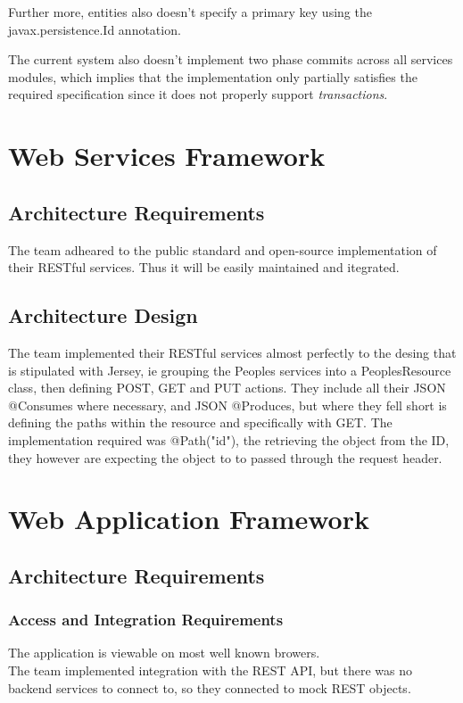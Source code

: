 \documentclass[a4paper,10pt]{article}
\begin{document}
Further more, entities also doesn't specify a primary key using the javax.persistence.Id annotation.

The current system also doesn't implement two phase commits across all services modules, which implies that the implementation only partially satisfies the required specification since it does not
properly support \textit{transactions}.

\section{Web Services Framework}
  \subsection{Architecture Requirements}
    The team adheared to the public standard and open-source implementation of their RESTful services. Thus it will be easily maintained and itegrated.
  \subsection{Architecture Design}
    The team implemented their RESTful services almost perfectly to the desing that is stipulated with Jersey, ie grouping the Peoples services into a PeoplesResource class, then defining POST, GET and PUT actions. They include all their JSON @Consumes where necessary, and JSON @Produces, but where they fell short is defining the paths within the resource and specifically with GET. The implementation required was @Path("{id}"), the retrieving the object from the ID, they however are expecting the object to to passed through the request header.


\section{Web Application Framework}
  \subsection{Architecture Requirements}
    \subsubsection{Access and Integration Requirements}
      The application is viewable on most well known browers.\\
      The team implemented integration with the REST API, but there was no backend services to connect to, so they connected to mock REST objects.
\end{document}
